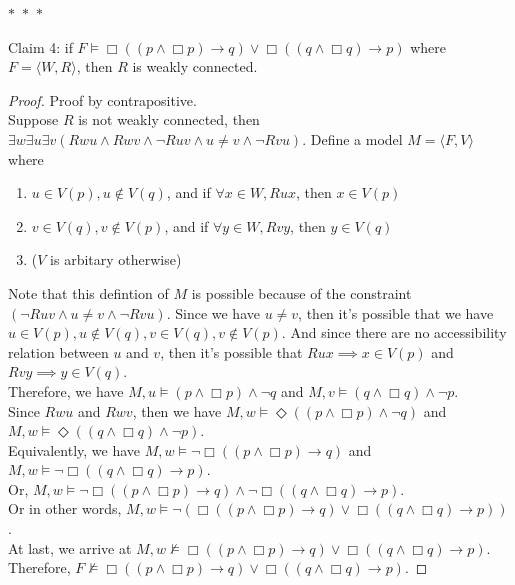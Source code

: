 \documentclass[12pt]{article}
\newcommand{\B}{\Box}
\newcommand{\D}{\Diamond}
\newcommand{\s}{\vDash}
\newcommand{\ns}{\nvDash}
\begin{document}
\noindent
\begin{center}
    $\ast$~$\ast$~$\ast$
\end{center}
Claim 4: if $F \vDash \B((p \land \B p) \to q) \lor \B((q \land \B q) \to p)$ where $F = \langle W, R \rangle$, then $R$ is weakly connected. 
\begin{proof} Proof by contrapositive.\\
    Suppose $R$ is not weakly connected, then $\exists w \exists u \exists v (Rwu \land Rwv \land \neg Ruv \land u \neq v \land \neg Rvu)$.
    Define a model $M = \langle F, V \rangle$ where
    \begin{enumerate}
        \item $u \in V(p), u \notin V(q)$, and if $\forall x \in W, Rux$, then $x \in V(p)$
        \item $v \in V(q), v \notin V(p)$, and if $\forall y \in W, Rvy$, then $y \in V(q)$
        \item ($V$ is arbitary otherwise)
    \end{enumerate}
    Note that this defintion of $M$ is possible because of the constraint $(\neg Ruv \land u \neq v \land \neg Rvu)$.
    Since we have $u \neq v$, then it's possible that we have $u \in V(p), u \notin V(q), v \in V(q), v \notin V(p)$.
    And since there are no accessibility relation between $u$ and $v$, then it's possible that $Rux \implies x \in V(p)$ and $Rvy \implies y \in V(q)$.\\
    Therefore, we have $M, u \s (p \land \B p) \land \neg q$ and $M, v \s (q \land \B q) \land \neg p$.\\
    Since $Rwu$ and $Rwv$, then we have $M, w \s \D ((p \land \B p) \land \neg q)$ and $M, w \s \D ((q \land \B q) \land \neg p)$.\\
    Equivalently, we have $M, w \s \neg \B ((p \land \B p) \to q)$ and $M, w \s \neg \B ((q \land \B q) \to p)$.\\
    Or, $M, w \s \neg \B ((p \land \B p) \to q) \land \neg \B ((q \land \B q) \to p)$.\\
    Or in other words, $M, w \s \neg(\B ((p \land \B p) \to q) \lor \B ((q \land \B q) \to p))$.\\
    At last, we arrive at $M, w \ns \B ((p \land \B p) \to q) \lor \B ((q \land \B q) \to p)$.\\
    Therefore, $F \ns \B ((p \land \B p) \to q) \lor \B ((q \land \B q) \to p)$.

\end{proof}
\end{document}
